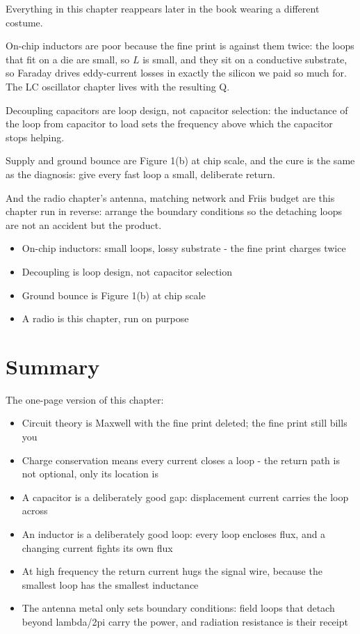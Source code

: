 Everything in this chapter reappears later in the book wearing a
different costume.

On-chip inductors are poor because the fine print is against them twice:
the loops that fit on a die are small, so \(L\) is small, and they sit
on a conductive substrate, so Faraday drives eddy-current losses in
exactly the silicon we paid so much for. The LC oscillator chapter lives
with the resulting Q.

Decoupling capacitors are loop design, not capacitor selection: the
inductance of the loop from capacitor to load sets the frequency above
which the capacitor stops helping.

Supply and ground bounce are Figure 1(b) at chip scale, and the cure is
the same as the diagnosis: give every fast loop a small, deliberate
return.

And the radio chapter's antenna, matching network and Friis budget are
this chapter run in reverse: arrange the boundary conditions so the
detaching loops are not an accident but the product.

\begin{itemize}
\tightlist
\item
  On-chip inductors: small loops, lossy substrate - the fine print
  charges twice
\item
  Decoupling is loop design, not capacitor selection
\item
  Ground bounce is Figure 1(b) at chip scale
\item
  A radio is this chapter, run on purpose
\end{itemize}

\section{Summary}\label{summary}

The one-page version of this chapter:

\begin{itemize}
\tightlist
\item
  Circuit theory is Maxwell with the fine print deleted; the fine print
  still bills you
\item
  Charge conservation means every current closes a loop - the return
  path is not optional, only its location is
\item
  A capacitor is a deliberately good gap: displacement current carries
  the loop across
\item
  An inductor is a deliberately good loop: every loop encloses flux, and
  a changing current fights its own flux
\item
  At high frequency the return current hugs the signal wire, because the
  smallest loop has the smallest inductance
\item
  The antenna metal only sets boundary conditions: field loops that
  detach beyond lambda/2pi carry the power, and radiation resistance is
  their receipt
\end{itemize}


